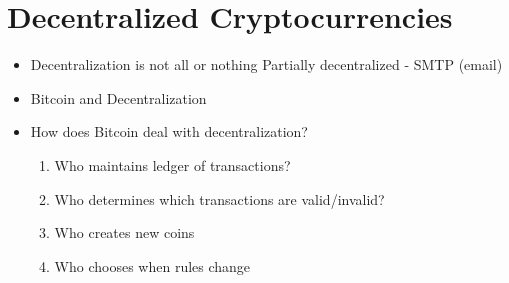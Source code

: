 \documentclass{article}
\begin{document}
\section*{Decentralized Cryptocurrencies}
\begin{itemize}
  \item Decentralization is not all or nothing
    \subitem Partially decentralized - SMTP (email)
  \item Bitcoin and Decentralization
  \item How does Bitcoin deal with decentralization?
    \begin{enumerate}
      \item Who maintains ledger of transactions?
      \item Who determines which transactions are valid/invalid?
      \item Who creates new coins
      \item Who chooses when rules change
    \end{enumerate}
\end{itemize}
\end{document}
